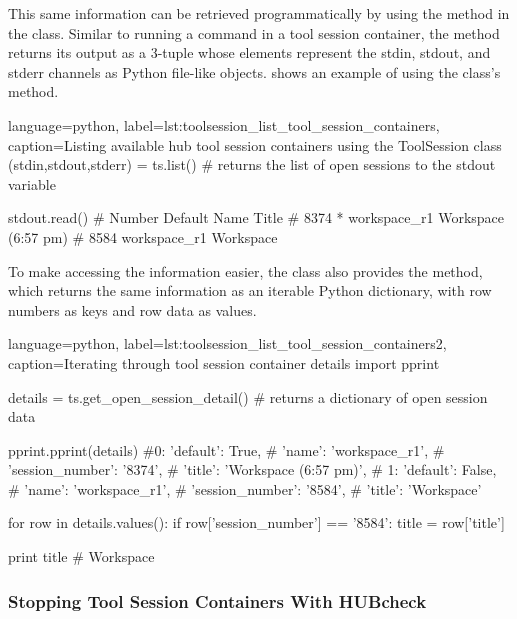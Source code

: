 This same information can be retrieved programmatically by using the
 method in the  class. Similar to running
a command in a tool session container, the  method returns its
output as a 3-tuple whose elements represent the stdin, stdout, and stderr
channels as Python file-like objects.
 shows an example of using
the  class's  method.

\begin{xcode}{%
  language=python,%
  label=lst:toolsession_list_tool_session_containers,%
  caption={Listing available hub tool session containers using the ToolSession class}%
}
(stdin,stdout,stderr) = ts.list()
# returns the list of open sessions to the stdout variable

stdout.read()
#   Number  Default Name                 Title
#     8374     *    workspace_r1         Workspace (6:57 pm)
#     8584          workspace_r1         Workspace
\end{xcode}

To make accessing the information easier, the  class also
provides the  method, which returns the
same information as an iterable Python dictionary, with row numbers as keys and
row data as values.

\begin{xcode}{%
  language=python,%
  label=lst:toolsession_list_tool_session_containers2,%
  caption={Iterating through tool session container details}%
}
import pprint

details = ts.get_open_session_detail()
# returns a dictionary of open session data

pprint.pprint(details)
#{0: {'default': True,
#     'name': 'workspace_r1',
#     'session_number': '8374',
#     'title': 'Workspace (6:57 pm)'},
# 1: {'default': False,
#     'name': 'workspace_r1',
#     'session_number': '8584',
#     'title': 'Workspace'}}

for row in details.values():
  if row['session_number'] == '8584':
    title = row['title']

print title
# Workspace
\end{xcode}


\subsubsection{Stopping Tool Session Containers With HUBcheck}
\label{ssec:hubcheck_shell_modules_stop_containers}

